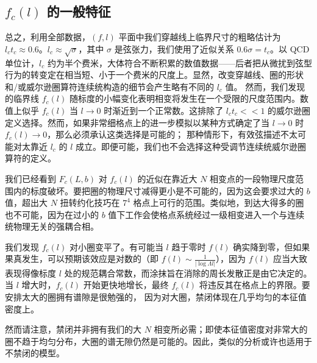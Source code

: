 \subsection{$f_c (l)$ 的一般特征}

总之，利用全部数据，$(f,l)$ 平面中我们穿越线上临界尺寸的粗略估计为 $l_ct_c\approx
0.6$。$l_c\approx \sqrt{\sigma}$，其中 $\sigma$ 是弦张力，我们使用了近似关系 $0.6 \sigma=t_c$。以 QCD 单位计，$l_c$ 约为半个费米，大体符合不断积累的数值数据——后者把从微扰到弦型行为的转变定在相当短、小于一个费米的尺度上。显然，改变穿越线、圈的形状和/或威尔逊圈算符连续统构造的细节会产生略有不同的 $l_c$ 值。
然而，我们发现的临界线 $f_c( l)$ 随标度的小幅变化表明相变将发生在一个受限的尺度范围内。数值上似乎 $f_c(l)$ 当 $l\to 0$ 时渐近到一个正常数。这排除了 $l_c t_c << 1$ 的威尔逊圈定义选择。然而，如果非常细格点上的进一步模拟以某种方式确定了当 $l\to 0$ 时 $f_c(l)\to 0$，那么必须承认这类选择是可能的；
那种情形下，有效弦描述不太可能对太靠近 $l_c$ 的 $l$ 成立。即便可能，我们也不会选择这种受调节连续统威尔逊圈算符的定义。

我们已经看到 $F_c(L,b)$ 对 $f_c (l)$ 的近似在靠近大 $N$ 相变点的一段物理尺度范围内的标度破坏。要把圈的物理尺寸减得更小是不可能的，因为这会要求过大的 $b$ 值，超出大 $N$ 扭转约化技巧在 $7^4$ 格点上可行的范围。类似地，到达大得多的圈也不可能，因为在过小的 $b$ 值下工作会使格点系统经过一级相变进入一个与连续统物理无关的强耦合相。

我们发现 $f_c(l)$ 对小圈变平了。有可能当 $l$ 趋于零时 $f(l)$ 确实降到零，但如果果真发生，可以预期该效应是对数的（即
$f(l) \sim\frac{1}{|\log \Lambda l|}$），因为 $f(l)$ 应当大致表现得像标度 $l$ 处的规范耦合常数，而涂抹旨在消除的周长发散正是由它决定的。当 $l$ 增大时，$f_c(l)$ 开始更快地增长，最终 $f_c(l)$ 将违反其在格点上的界限。要安排太大的圈拥有谱隙是很勉强的，
因为对大圈，禁闭体现在几乎均匀的本征值密度上。

然而请注意，禁闭并非拥有我们的大 $N$ 相变所必需；即使本征值密度对非常大的圈不趋于均匀分布，大圈的谱无隙仍然是可能的。因此，类似的分析或许也适用于不禁闭的模型。
